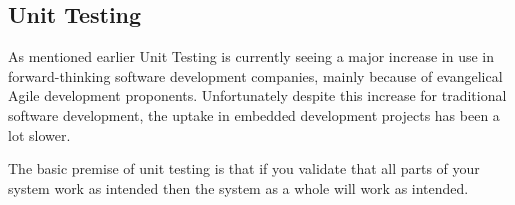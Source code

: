 \subsection{Unit Testing}
  
  As mentioned earlier Unit Testing is currently seeing a major increase in use
  in forward-thinking software development companies, mainly because of
  evangelical Agile development proponents.  Unfortunately despite this increase
  for traditional software development, the uptake in embedded development
  projects has been a lot slower.

  The basic premise of unit testing is that if you validate that all parts of
  your system work as intended then the system as a whole will work as intended.
